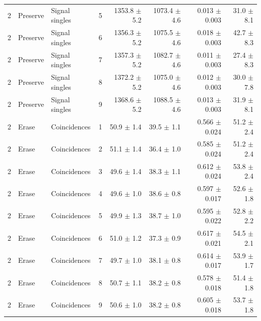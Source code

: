 \begin{tabular}{llllrrrr}
2 & Preserve & Signal singles & 5 & 1353.8 \ensuremath{\pm} 5.2 & 1073.4 \ensuremath{\pm} 4.6 & 0.013 \ensuremath{\pm} 0.003 & 31.0 \ensuremath{\pm} 8.1 \\
2 & Preserve & Signal singles & 6 & 1356.3 \ensuremath{\pm} 5.2 & 1075.5 \ensuremath{\pm} 4.6 & 0.018 \ensuremath{\pm} 0.003 & 42.7 \ensuremath{\pm} 8.3 \\
2 & Preserve & Signal singles & 7 & 1357.3 \ensuremath{\pm} 5.2 & 1082.7 \ensuremath{\pm} 4.6 & 0.011 \ensuremath{\pm} 0.003 & 27.4 \ensuremath{\pm} 8.3 \\
2 & Preserve & Signal singles & 8 & 1372.2 \ensuremath{\pm} 5.2 & 1075.0 \ensuremath{\pm} 4.6 & 0.012 \ensuremath{\pm} 0.003 & 30.0 \ensuremath{\pm} 7.8 \\
2 & Preserve & Signal singles & 9 & 1368.6 \ensuremath{\pm} 5.2 & 1088.5 \ensuremath{\pm} 4.6 & 0.013 \ensuremath{\pm} 0.003 & 31.9 \ensuremath{\pm} 8.1 \\
\midrule
2 & Erase & Coincidences & 1 & 50.9 \ensuremath{\pm} 1.4 & 39.5 \ensuremath{\pm} 1.1 & 0.566 \ensuremath{\pm} 0.024 & 51.2 \ensuremath{\pm} 2.4 \\
2 & Erase & Coincidences & 2 & 51.1 \ensuremath{\pm} 1.4 & 36.4 \ensuremath{\pm} 1.0 & 0.585 \ensuremath{\pm} 0.024 & 51.2 \ensuremath{\pm} 2.4 \\
2 & Erase & Coincidences & 3 & 49.6 \ensuremath{\pm} 1.4 & 38.3 \ensuremath{\pm} 1.1 & 0.612 \ensuremath{\pm} 0.024 & 53.8 \ensuremath{\pm} 2.4 \\
2 & Erase & Coincidences & 4 & 49.6 \ensuremath{\pm} 1.0 & 38.6 \ensuremath{\pm} 0.8 & 0.597 \ensuremath{\pm} 0.017 & 52.6 \ensuremath{\pm} 1.8 \\
2 & Erase & Coincidences & 5 & 49.9 \ensuremath{\pm} 1.3 & 38.7 \ensuremath{\pm} 1.0 & 0.595 \ensuremath{\pm} 0.022 & 52.8 \ensuremath{\pm} 2.2 \\
2 & Erase & Coincidences & 6 & 51.0 \ensuremath{\pm} 1.2 & 37.3 \ensuremath{\pm} 0.9 & 0.617 \ensuremath{\pm} 0.021 & 54.5 \ensuremath{\pm} 2.1 \\
2 & Erase & Coincidences & 7 & 49.7 \ensuremath{\pm} 1.0 & 38.1 \ensuremath{\pm} 0.8 & 0.614 \ensuremath{\pm} 0.017 & 53.9 \ensuremath{\pm} 1.7 \\
2 & Erase & Coincidences & 8 & 50.7 \ensuremath{\pm} 1.1 & 38.2 \ensuremath{\pm} 0.8 & 0.578 \ensuremath{\pm} 0.018 & 51.4 \ensuremath{\pm} 1.8 \\
2 & Erase & Coincidences & 9 & 50.6 \ensuremath{\pm} 1.0 & 38.2 \ensuremath{\pm} 0.8 & 0.605 \ensuremath{\pm} 0.018 & 53.7 \ensuremath{\pm} 1.8 \\

\end{tabular}
